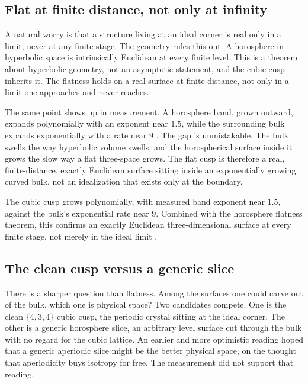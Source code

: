 \subsection{Flat at finite distance, not only at infinity}

A natural worry is that a structure living at an ideal corner is real only in a limit, never at any finite stage.
The geometry rules this out. A horosphere in hyperbolic space is intrinsically Euclidean at every finite level.
This is a theorem about hyperbolic geometry, not an asymptotic statement, and the cubic cusp inherits it. The
flatness holds on a real surface at finite distance, not only in a limit one approaches and never reaches.

The same point shows up in measurement. A horosphere band, grown outward, expands polynomially with an exponent
near $1.5$, while the surrounding bulk expands exponentially with a rate near $9$ \cite{pollard2026vibetest}. The
gap is unmistakable. The bulk swells the way hyperbolic volume swells, and the horospherical surface inside it
grows the slow way a flat three-space grows. The flat cusp is therefore a real, finite-distance, exactly
Euclidean surface sitting inside an exponentially growing curved bulk, not an idealization that exists only at
the boundary.

\begin{result}
The cubic cusp grows polynomially, with measured band exponent near $1.5$, against the bulk's exponential rate
near $9$. Combined with the horosphere flatness theorem, this confirms an exactly Euclidean three-dimensional
surface at every finite stage, not merely in the ideal limit \cite{pollard2026vibetest}.
\end{result}

\subsection{The clean cusp versus a generic slice}

There is a sharper question than flatness. Among the surfaces one could carve out of the bulk, which one is
physical space? Two candidates compete. One is the clean $\{4,3,4\}$ cubic cusp, the periodic crystal sitting at
the ideal corner. The other is a generic horosphere slice, an arbitrary level surface cut through the bulk with
no regard for the cubic lattice. An earlier and more optimistic reading hoped that a generic aperiodic slice
might be the better physical space, on the thought that aperiodicity buys isotropy for free. The measurement did
not support that reading.

